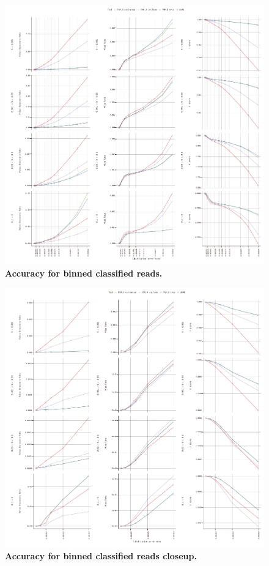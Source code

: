 \documentclass[10pt,twocolumn]{article}
\begin{document}
\begin{figure}[htbp]
\centering
\includegraphics[keepaspectratio,scale=1]{../plot/7_classified_accuracy_0550_binned}
\caption{\footnotesize{\textbf{Accuracy for binned classified reads.} } }
\label{fig:07}
\end{figure}

\begin{figure}[htbp]
\centering
\includegraphics[keepaspectratio,scale=1]{../plot/8_classified_accuracy_0060_binned}
\caption{\footnotesize{\textbf{Accuracy for binned classified reads closeup.} } }
\label{fig:08}
\end{figure}
\end{document}
